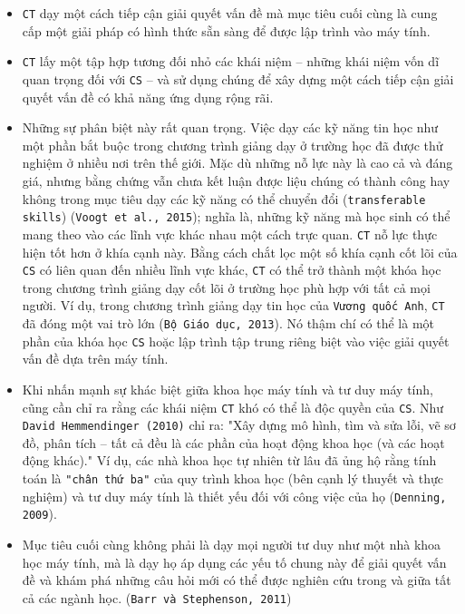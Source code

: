 \begin{itemize}
\begin{itemize}
        \item \texttt{CT} dạy một cách tiếp cận giải quyết vấn đề mà mục tiêu cuối cùng là cung cấp một giải pháp có hình thức sẵn sàng để được lập trình vào máy tính.

        \item \texttt{CT} lấy một tập hợp tương đối nhỏ các khái niệm – những khái niệm vốn dĩ quan trọng đối với \texttt{CS} – và sử dụng chúng để xây dựng một cách tiếp cận giải quyết vấn đề có khả năng ứng dụng rộng rãi.

        \item Những sự phân biệt này rất quan trọng. Việc dạy các kỹ năng tin học như một phần bắt buộc trong chương trình giảng dạy ở trường học đã được thử nghiệm ở nhiều nơi trên thế giới. Mặc dù những nỗ lực này là cao cả và đáng giá, nhưng bằng chứng vẫn chưa kết luận được liệu chúng có thành công hay không trong mục tiêu dạy các kỹ năng có thể chuyển đổi (\verb|transferable skills|) (\texttt{Voogt et al., 2015}); nghĩa là, những kỹ năng mà học sinh có thể mang theo vào các lĩnh vực khác nhau một cách trực quan. \texttt{CT} nỗ lực thực hiện tốt hơn ở khía cạnh này. Bằng cách chắt lọc một số khía cạnh cốt lõi của \texttt{CS} có liên quan đến nhiều lĩnh vực khác, \texttt{CT} có thể trở thành một khóa học trong chương trình giảng dạy cốt lõi ở trường học phù hợp với tất cả mọi người. Ví dụ, trong chương trình giảng dạy tin học của \texttt{Vương quốc Anh}, \texttt{CT} đã đóng một vai trò lớn (\texttt{Bộ Giáo dục, 2013}). Nó thậm chí có thể là một phần của khóa học \texttt{CS} hoặc lập trình tập trung riêng biệt vào việc giải quyết vấn đề dựa trên máy tính.

        \item Khi nhấn mạnh sự khác biệt giữa khoa học máy tính và tư duy máy tính, cũng cần chỉ ra rằng các khái niệm \texttt{CT} khó có thể là độc quyền của \texttt{CS}. Như \texttt{David Hemmendinger (2010)} chỉ ra: "Xây dựng mô hình, tìm và sửa lỗi, vẽ sơ đồ, phân tích – tất cả đều là các phần của hoạt động khoa học (và các hoạt động khác)." Ví dụ, các nhà khoa học tự nhiên từ lâu đã ủng hộ rằng tính toán là \verb|"chân thứ ba"| của quy trình khoa học (bên cạnh lý thuyết và thực nghiệm) và tư duy máy tính là thiết yếu đối với công việc của họ (\texttt{Denning, 2009}).

        \item Mục tiêu cuối cùng không phải là dạy mọi người tư duy như một nhà khoa học máy tính, mà là dạy họ áp dụng các yếu tố chung này để giải quyết vấn đề và khám phá những câu hỏi mới có thể được nghiên cứu trong và giữa tất cả các ngành học. (\texttt{Barr và Stephenson, 2011})
    \end{itemize}


\end{itemize}
